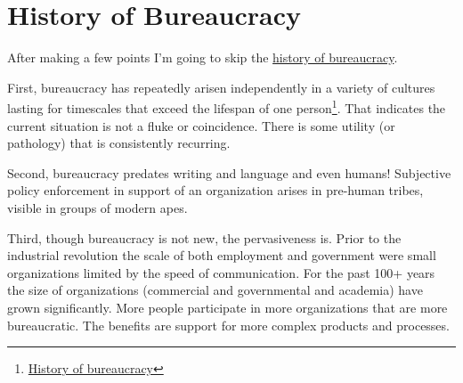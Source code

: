 \section{History of Bureaucracy}

After making a few points I'm going to skip the \href{https://en.wikipedia.org/wiki/Bureaucracy#History}{history of bureaucracy}.  %

First, bureaucracy has repeatedly arisen independently in a variety of cultures lasting for timescales that exceed the lifespan of one person\footnote{\href{https://www.youtube.com/watch?v=B_nsZlcC12g}{History of bureaucracy}}. That indicates the current situation is not a fluke or coincidence. There is some utility (or pathology) that is consistently recurring. 


Second, bureaucracy predates writing and language and even humans! Subjective policy enforcement in support of an organization arises in pre-human tribes, visible in groups of modern apes. 


Third, though bureaucracy is not new, the pervasiveness is. Prior to the industrial revolution the scale of both employment and government were small organizations limited by the speed of communication. For the past 100+ years the size of organizations (commercial and governmental and academia) have grown significantly. More people participate in more organizations that are more bureaucratic. The benefits are support for more complex products and processes. 

